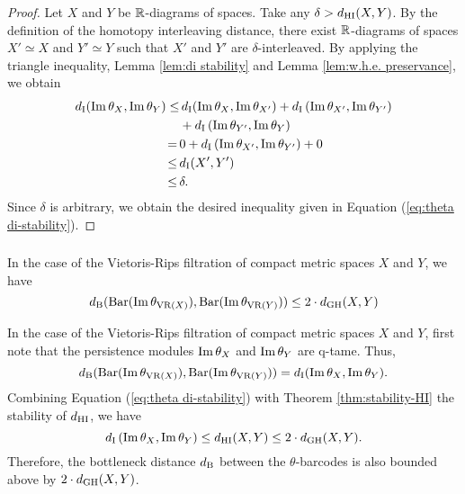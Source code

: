 \begin{proof}
    Let $X$ and $Y$ be $\mathbb{R}$-diagrams of spaces. Take any $\delta>d_{\mathrm{HI}}(X,Y)$. By the definition of the homotopy interleaving distance, there exist $\mathbb{R}$-diagrams of spaces $X'\simeq X$ and $Y'\simeq Y$ such that $X'$ and $Y'$ are $\delta$-interleaved. By applying the triangle inequality, Lemma \ref{lem:di stability} and Lemma \ref{lem:w.h.e. preservance}, we obtain
    \begin{align*}
        d_{\mathrm{I}}(\operatorname{Im}\theta_{X}, \operatorname{Im}\theta_{Y}) \leq& \, d_{\mathrm{I}}(\operatorname{Im}\theta_{X}, \operatorname{Im}\theta_{X'}) +
        d_{\mathrm{I}}\left(\operatorname{Im}\theta_{X'}, \operatorname{Im}\theta_{Y'}\right) \\
        &+d_{\mathrm{I}}\left(\operatorname{Im}\theta_{Y'}, \operatorname{Im}\theta_{Y}\right) \\ =\, 
        & 0+d_{\mathrm{I}}\left(\operatorname{Im}\theta_{X'}, \operatorname{Im}\theta_{Y'}\right)+0\\
        \leq \,& d_{\mathrm{I}}(X',Y') \\
        \leq \,& \delta.
    \end{align*}
    Since $\delta$ is arbitrary, we obtain the desired inequality given in Equation (\ref{eq:theta di-stability}).
\end{proof}

\subsubsection{}
\corollary
In the case of the Vietoris-Rips filtration of compact metric spaces $X$ and $Y$, we have
\[
d_{\mathrm{B}}(\operatorname{Bar}(\operatorname{Im} \theta_{\operatorname{VR}(X)}), \operatorname{Bar}(\operatorname{Im} \theta_{\operatorname{VR}(Y)})) \leq 2 \cdot d_{\mathrm{GH}}(X,Y)
\]


In the case of the Vietoris-Rips filtration of compact metric spaces $X$ and $Y$, first note that the persistence modules $\operatorname{Im}\theta_{X}$ and $\operatorname{Im}\theta_{Y}$ are q-tame. Thus,
\[
d_{\mathrm{B}}(\operatorname{Bar}(\operatorname{Im} \theta_{\operatorname{VR}(X)}), \operatorname{Bar}(\operatorname{Im} \theta_{\operatorname{VR}(Y)})) = d_{\mathrm{I}}(\operatorname{Im}\theta_{X}, \operatorname{Im}\theta_{Y}).
\]
Combining Equation (\ref{eq:theta di-stability}) with Theorem \ref{thm:stability-HI} the stability of $d_{\mathrm{HI}}$, we have
\[d_{\mathrm{I}}\left(\operatorname{Im}\theta_{X}, \operatorname{Im}\theta_{Y}\right)\leq d_{\mathrm{HI}}(X,Y)\leq 2\cdot d_{\mathrm{GH}}(X,Y).\]
Therefore, the bottleneck distance $d_{\mathrm{B}}$ between the $\theta$-barcodes is also bounded above by $2\cdot d_{\mathrm{GH}}(X,Y)$.